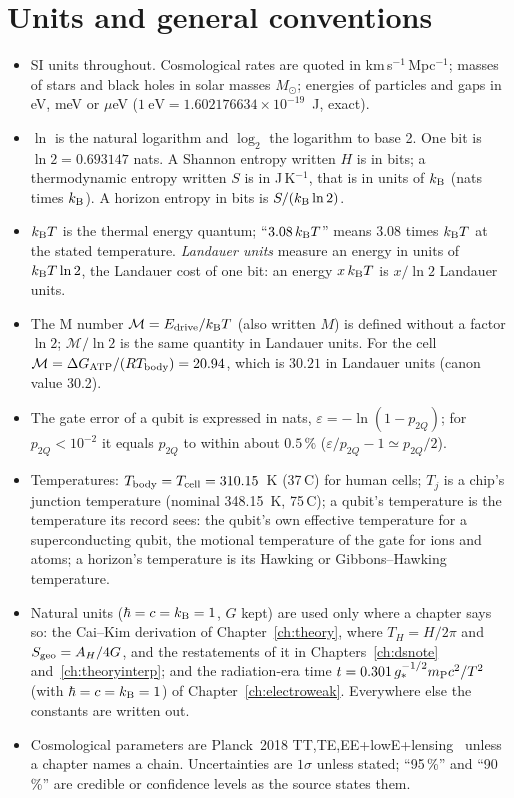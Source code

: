\section{Units and general conventions}
\begin{itemize}
\item SI units throughout. Cosmological rates are quoted in km\,s$^{-1}$\,Mpc$^{-1}$; masses of stars and black holes in solar masses $M_\odot$; energies of
particles and gaps in eV, meV or $\mu$eV ($1~\mathrm{eV}=1.602176634\times10^{-19}$~J, exact).
\item $\ln$ is the natural logarithm and $\log_2$ the logarithm to base 2. One bit is $\ln2=0.693147$ nats. A Shannon entropy written $H$ is in bits; a
thermodynamic entropy written $S$ is in J\,K$^{-1}$, that is in units of $k_{\mathrm B}$ (nats times $k_{\mathrm B}$). A horizon entropy in bits is $S/(k_{\mathrm B}\ln2)$.
\item $k_{\mathrm B} T$ is the thermal energy quantum; ``$3.08\,k_{\mathrm B} T$'' means $3.08$ times $k_{\mathrm B} T$ at the stated temperature. \emph{Landauer units} measure an energy in units
of $k_{\mathrm B} T\ln2$, the Landauer cost of one bit: an energy $x\,k_{\mathrm B} T$ is $x/\ln2$ Landauer units.
\item The M number $\mathcal M=E_{\rm drive}/k_{\mathrm B} T$ (also written $M$) is defined without a factor $\ln2$; $\mathcal M/\ln2$ is the same quantity in Landauer units. For
the cell $\mathcal M=\Delta G_{\mathrm{ATP}}/(RT_{\mathrm{body}})=20.94$, which is $30.21$ in Landauer units (canon value 30.2).
\item The gate error of a qubit is expressed in nats, $\varepsilon=-\ln(1-p_{2Q})$; for $p_{2Q}<10^{-2}$ it equals $p_{2Q}$ to within about $0.5\,\%$ ($\varepsilon/p_{2Q}-1\simeq p_{2Q}/2$).
\item Temperatures: $T_{\mathrm{body}}=T_{\rm cell}=310.15$~K (37\,\textdegree C) for human cells; $T_j$ is a chip's junction temperature (nominal 348.15~K, 75\,\textdegree C); a
qubit's temperature is the temperature its record sees: the qubit's own effective temperature for a superconducting qubit, the motional temperature of the gate for ions and atoms; a horizon's temperature is its Hawking or
Gibbons--Hawking temperature.
\item Natural units ($\hbar=c=k_{\mathrm B}=1$, $G$ kept) are used only where a chapter says so: the Cai--Kim derivation of Chapter~\ref{ch:theory}, where
$T_H=H/2\pi$ and $S_{\rm geo}=A_H/4G$, and the restatements of it in Chapters~\ref{ch:dsnote} and~\ref{ch:theoryinterp}; and the radiation-era time $t=0.301\,g_*^{-1/2}m_{\mathrm P} c^2/T^2$ (with $\hbar=c=k_{\mathrm B}=1$) of Chapter~\ref{ch:electroweak}. Everywhere else the constants are written out.
\item Cosmological parameters are Planck~2018 TT,TE,EE+lowE+lensing~\cite{Planck2018VI} unless a chapter names a chain. Uncertainties are $1\sigma$ unless
stated; ``95\,\%'' and ``90\,\%'' are credible or confidence levels as the source states them.
\end{itemize}

